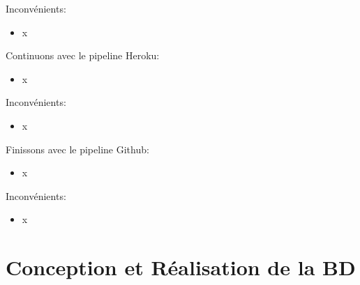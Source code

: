 \documentclass[
    iai, %
    il, %
]{heig-tb}
\begin{document}
Inconvénients:
\begin{itemize}
    \item x
\end{itemize}

Continuons avec le pipeline Heroku:
\begin{itemize}
    \item x
\end{itemize}

Inconvénients:
\begin{itemize}
    \item x
\end{itemize}

Finissons avec le pipeline Github:
\begin{itemize}
    \item x
\end{itemize}

Inconvénients:
\begin{itemize}
    \item x
\end{itemize}





\chapter{Conception et Réalisation de la BD}
\end{document}
